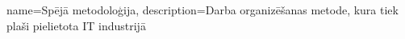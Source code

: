 \makeglossaries

{
    name=Spējā metodoloģija,
    description={Darba organizēšanas metode, kura tiek plaši pielietota IT industrijā}
}

